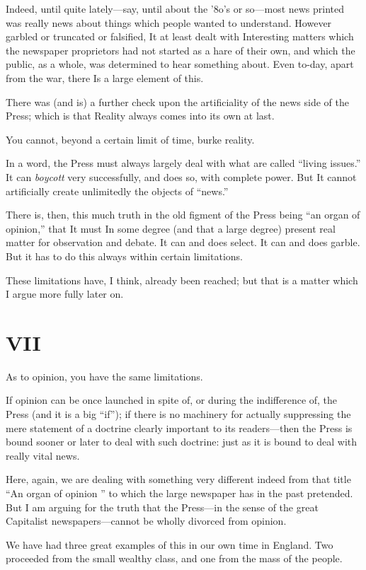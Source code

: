 \documentclass{book}
\begin{document}
Indeed, until quite lately—say, until about the ’8o’s or so—most news printed was really news about things which people wanted to understand. However garbled or truncated or falsified, It at least dealt with Interesting matters which the newspaper proprietors had not started as a hare of their own, and which the public, as a whole, was determined to hear something about. Even to-day, apart from the war, there Is a large element of this.

There was (and is) a further check upon the artificiality of the news side of the Press; which is that Reality always comes into its own at last.

You cannot, beyond a certain limit of time, burke reality.

In a word, the Press must always largely deal with what are called “living issues.” It can \emph{boycott} very successfully, and does so, with complete power. But It cannot artificially create unlimitedly the objects of “news.”

There is, then, this much truth in the old figment of the Press being “an organ of opinion,” that It must In some degree (and that a large degree) present real matter for observation and debate. It can and does select. It can and does garble. But it has to do this always within certain limitations.

These limitations have, I think, already been reached; but that is a matter which I argue more fully later on.

\chapter*{VII}
\label{chapter-8}
As to opinion, you have the same limitations.

If opinion can be once launched in spite of, or during the indifference of, the Press (and it is a big “if”); if there is no machinery for actually suppressing the mere statement of a doctrine clearly important to its readers—then the Press is bound sooner or later to deal with such doctrine: just as it is bound to deal with really vital news.

Here, again, we are dealing with something very different indeed from that title “An organ of opinion ” to which the large newspaper has in the past pretended. But I am arguing for the truth that the Press—in the sense of the great Capitalist newspapers—cannot be wholly divorced from opinion.

We have had three great examples of this in our own time in England. Two proceeded from the small wealthy class, and one from the mass of the people.
\end{document}
